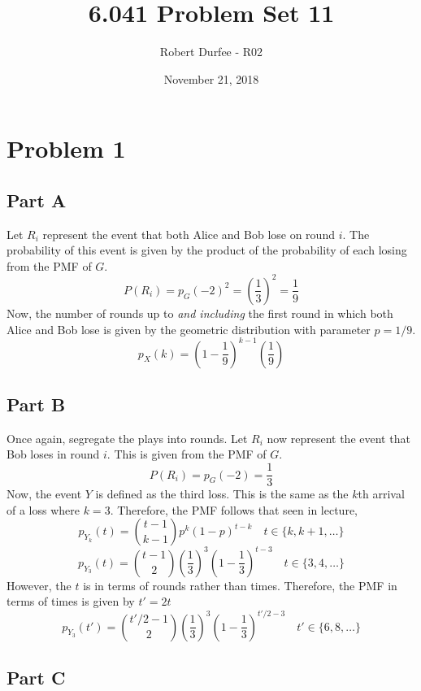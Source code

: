 \documentclass{article}
\title{6.041 Problem Set 11}
\author{Robert Durfee - R02}
\date{November 21, 2018}
\begin{document}
\maketitle

\section*{Problem 1}

\subsection*{Part A}

Let $R_i$ represent the event that both Alice and Bob lose on round $i$. The
probability of this event is given by the product of the probability of each
losing from the PMF of $G$.
$$ P(R_i) = p_G(-2)^2 = \left(\frac{1}{3}\right)^2 = \frac{1}{9} $$
Now, the number of rounds up to \textit{and including} the first round in
which both Alice and Bob lose is given by the geometric distribution with
parameter $p = 1/9$.
$$ p_X(k) = \left(1 - \frac{1}{9}\right)^{k - 1} \left(\frac{1}{9}\right) $$

\subsection*{Part B}

Once again, segregate the plays into rounds. Let $R_i$ now represent the
event that Bob loses in round $i$. This is given from the PMF of $G$.
$$ P(R_i) = p_G(-2) = \frac{1}{3} $$
Now, the event $Y$ is defined as the third loss. This is the same as the
$k$th arrival of a loss where $k = 3$. Therefore, the PMF follows that seen
in lecture,
$$ p_{Y_k}(t) = \binom{t - 1}{k - 1} p^k (1 - p)^{t - k}\quad t \in \{k, k +
1, \ldots\} $$
$$ p_{Y_3}(t) = \binom{t - 1}{2} \left(\frac{1}{3}\right)^3 \left(1 -
\frac{1}{3}\right)^{t - 3} \quad t \in \{3, 4, \ldots\} $$
However, the $t$ is in terms of rounds rather than times. Therefore, the PMF
in terms of times is given by $t' = 2t$
$$ p_{Y_3}(t') = \binom{t'/2 - 1}{2} \left(\frac{1}{3}\right)^3 \left(1 -
\frac{1}{3}\right)^{t'/2 - 3} \quad t' \in \{6, 8, \ldots \} $$

\subsection*{Part C}
\end{document}
